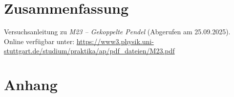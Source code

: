 \documentclass[
12pt,
a4paper,
bibliography=totocnumbered, %
BCOR=1cm, %
oneside, %
]{scrartcl}
\newcommand{\lh}{\ell_{\mathrm{H}}}
\begin{document}



\section{Zusammenfassung}

\begin{thebibliography}{999}
	 Versuchsanleitung zu \emph{M23 -- Gekoppelte Pendel} (Abgerufen am 25.09.2025).
	Online verfügbar unter: \url{https://www3.physik.uni-stuttgart.de/studium/praktika/ap/pdf_dateien/M23.pdf}
\end{thebibliography}

\section{Anhang}

%
\end{document}
